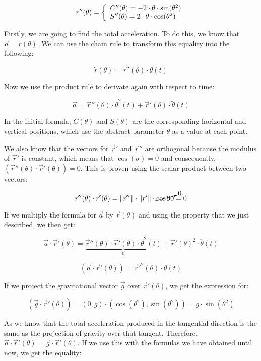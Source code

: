 \documentclass[12pt,twoside,a4paper]{article}
\begin{document}
	$$r''(\theta) = \left\{\begin{array}{ll} C''(\theta) = - 2 \cdot \theta \cdot \sin(\theta^2) \cr S''(\theta) = 2 \cdot \theta \cdot \cos(\theta^2) \end{array}\right.$$

	Firstly, we are going to find the total acceleration. To do this, we know that $\vec{a} = \ddot{r}(\theta)$. We can use the chain rule to transform this equality into the following:
	
	$$\dot{r}(\theta) = \vec{r}'(\theta) \cdot \dot{\theta}(t)$$
	
	Now we use the product rule to derivate again with respect to time:
	
	$$\vec{a} = \vec{r}''(\theta) \cdot \dot{\theta}^2(t) + \vec{r}'(\theta) \cdot \ddot{\theta}(t)$$

	In the initial formula, $C(\theta)$ and $S(\theta)$ are the corresponding horizontal and vertical positions, which use the abstract parameter $\theta$ as a value at each point.

	We also know that the vectors for $\vec{r}'$ and $\vec{r}''$ are orthogonal because the modulus of $\vec{r}'$ is constant, which means that $\cos(\sigma) = 0$ and consequently, $(\vec{r}''(\theta) \cdot \vec{r}'(\theta)) = 0$. This is proven using the scalar product between two vectors:
	
	$$\vec{r}''(\theta) \cdot \vec{r}'(\theta) = \|\vec{r}''\| \cdot \|\vec{r}'\| \cdot \cancelto{0}{\cos 90} = 0$$
	
	If we multiply the formula for $\vec{a}$ by $\vec{r}(\theta)$ and using the property that we just described, we then get:
	
	$$\vec{a} \cdot \vec{r}'(\theta) = \underset{0}{\underbrace{\vec{r}''(\theta) \cdot \vec{r}'(\theta) \cdot \dot{\theta}^2(t)}} + \vec{r}'(\theta)^2 \cdot \ddot{\theta}(t)$$
	
	$$(\vec{a} \cdot \vec{r}'(\theta))= \vec{r}'^2(\theta) \cdot \ddot{\theta}(t)$$
	
	If we project the gravitational vector $\vec{g}$ over $\vec{r}'(\theta)$, we get the expression for:
	
	$$(\vec{g} \cdot \vec{r}'(\theta)) = (0, g)\cdot(\cos(\theta^2), \sin(\theta^2)) = g \cdot \sin(\theta^2)$$
	
	As we know that the total acceleration produced in the tangential direction is the same as the projection of gravity over that tangent. Therefore, $\vec{a} \cdot \vec{r}'(\theta) = \vec{g} \cdot \vec{r}'(\theta)$. If we use this with the formulas we have obtained until now, we get the equality:
	
\end{document}
